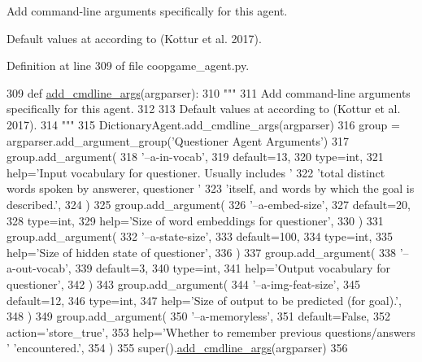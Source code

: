 \begin{DoxyVerb}Add command-line arguments specifically for this agent.

Default values at according to (Kottur et al. 2017).
\end{DoxyVerb}
 

Definition at line 309 of file coopgame\+\_\+agent.\+py.


\begin{DoxyCode}
309     \textcolor{keyword}{def }\hyperlink{namespaceparlai_1_1agents_1_1drqa_1_1config_a62fdd5554f1da6be0cba185271058320}{add\_cmdline\_args}(argparser):
310         \textcolor{stringliteral}{"""}
311 \textcolor{stringliteral}{        Add command-line arguments specifically for this agent.}
312 \textcolor{stringliteral}{}
313 \textcolor{stringliteral}{        Default values at according to (Kottur et al. 2017).}
314 \textcolor{stringliteral}{        """}
315         DictionaryAgent.add\_cmdline\_args(argparser)
316         group = argparser.add\_argument\_group(\textcolor{stringliteral}{'Questioner Agent Arguments'})
317         group.add\_argument(
318             \textcolor{stringliteral}{'--a-in-vocab'},
319             default=13,
320             type=int,
321             help=\textcolor{stringliteral}{'Input vocabulary for questioner. Usually includes '}
322             \textcolor{stringliteral}{'total distinct words spoken by answerer, questioner '}
323             \textcolor{stringliteral}{'itself, and words by which the goal is described.'},
324         )
325         group.add\_argument(
326             \textcolor{stringliteral}{'--a-embed-size'},
327             default=20,
328             type=int,
329             help=\textcolor{stringliteral}{'Size of word embeddings for questioner'},
330         )
331         group.add\_argument(
332             \textcolor{stringliteral}{'--a-state-size'},
333             default=100,
334             type=int,
335             help=\textcolor{stringliteral}{'Size of hidden state of questioner'},
336         )
337         group.add\_argument(
338             \textcolor{stringliteral}{'--a-out-vocab'},
339             default=3,
340             type=int,
341             help=\textcolor{stringliteral}{'Output vocabulary for questioner'},
342         )
343         group.add\_argument(
344             \textcolor{stringliteral}{'--a-img-feat-size'},
345             default=12,
346             type=int,
347             help=\textcolor{stringliteral}{'Size of output to be predicted (for goal).'},
348         )
349         group.add\_argument(
350             \textcolor{stringliteral}{'--a-memoryless'},
351             default=\textcolor{keyword}{False},
352             action=\textcolor{stringliteral}{'store\_true'},
353             help=\textcolor{stringliteral}{'Whether to remember previous questions/answers '} \textcolor{stringliteral}{'encountered.'},
354         )
355         super().\hyperlink{namespaceparlai_1_1agents_1_1drqa_1_1config_a62fdd5554f1da6be0cba185271058320}{add\_cmdline\_args}(argparser)
356 
\end{DoxyCode}
